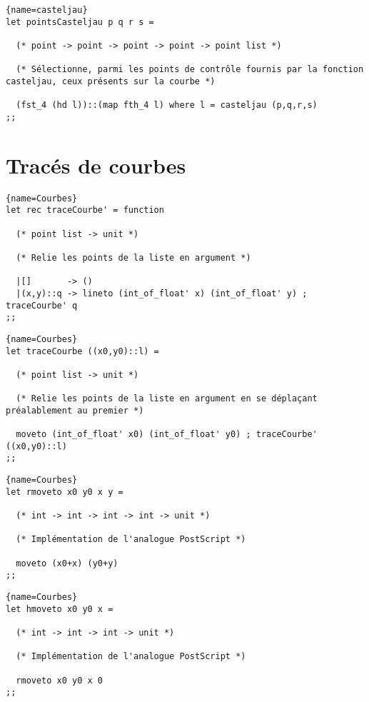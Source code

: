 \documentclass[10pt,twoside,a4paper]{article}
\begin{document}
\begin{lstlisting}{name=casteljau}
let pointsCasteljau p q r s =

  (* point -> point -> point -> point -> point list *)

  (* Sélectionne, parmi les points de contrôle fournis par la fonction casteljau, ceux présents sur la courbe *)

  (fst_4 (hd l))::(map fth_4 l) where l = casteljau (p,q,r,s)
;;
\end{lstlisting}
\lstset{frame=none}
\section{Tracés de courbes}%

\begin{lstlisting}{name=Courbes}
let rec traceCourbe' = function

  (* point list -> unit *)

  (* Relie les points de la liste en argument *)

  |[]       -> ()
  |(x,y)::q -> lineto (int_of_float' x) (int_of_float' y) ; traceCourbe' q
;;
\end{lstlisting}

\begin{lstlisting}{name=Courbes}
let traceCourbe ((x0,y0)::l) =

  (* point list -> unit *)

  (* Relie les points de la liste en argument en se déplaçant préalablement au premier *)
  
  moveto (int_of_float' x0) (int_of_float' y0) ; traceCourbe' ((x0,y0)::l)
;;
\end{lstlisting}
\pagebreak
\begin{lstlisting}{name=Courbes}
let rmoveto x0 y0 x y =

  (* int -> int -> int -> int -> unit *)

  (* Implémentation de l'analogue PostScript *)
  
  moveto (x0+x) (y0+y)
;;
\end{lstlisting}

\begin{lstlisting}{name=Courbes}
let hmoveto x0 y0 x =

  (* int -> int -> int -> unit *)

  (* Implémentation de l'analogue PostScript *)
  
  rmoveto x0 y0 x 0
;;
\end{lstlisting}
\end{document}
